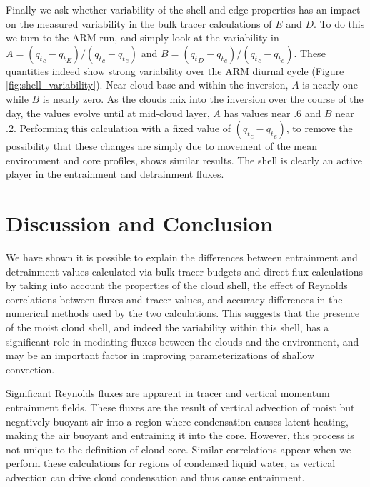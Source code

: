 \documentclass[draft,grl]{agutex}
\begin{document}
\begin{article}
Finally we ask whether variability of the shell and edge properties has an 
impact on the measured variability in the bulk tracer calculations of $E$ and 
$D$.  To do this we turn to the ARM run, and simply look at the variability in 
$A = ({q_t}_c - {q_t}_E)/({q_t}_c - {q_t}_e)$ and 
$B = ({q_t}_D - {q_t}_e)/({q_t}_c - {q_t}_e)$.  These quantities indeed show 
strong variability over the ARM diurnal cycle (Figure 
\ref{fig:shell_variability}).  Near cloud base and within the inversion, $A$ 
is nearly one while $B$ is nearly zero.  As the clouds mix into the inversion 
over the course of the day, the values evolve until at mid-cloud layer, $A$ 
has values near .6 and $B$ near .2.  Performing this calculation with a fixed 
value of $({q_t}_c - {q_t}_e)$, to remove the possibility that these changes 
are simply due to movement of the mean environment and core profiles, shows 
similar results.  The shell is clearly an active player in the entrainment and 
detrainment fluxes.


\section{Discussion and Conclusion}

We have shown it is possible to explain the differences between entrainment and 
detrainment values calculated via bulk tracer budgets and direct flux 
calculations by taking into account the properties of the cloud shell, the 
effect of Reynolds correlations between fluxes and tracer values, and 
accuracy differences in the numerical methods used by the two calculations.
This suggests that the presence of the moist cloud shell, and indeed the 
variability within this shell, has a significant role in mediating fluxes 
between the clouds and the environment, and may be an important factor in 
improving parameterizations of shallow convection.

Significant Reynolds fluxes are apparent in tracer and vertical momentum 
entrainment fields.  These fluxes are the result of vertical advection of 
moist but negatively buoyant air into a region where condensation causes 
latent heating, making the air buoyant and entraining it into the core.
However, this process is not unique to the definition of cloud core.  Similar 
correlations appear when we perform these calculations for regions of
condensed liquid water, as vertical advection can drive cloud condensation and 
thus cause entrainment.


\end{article}
\end{document}
